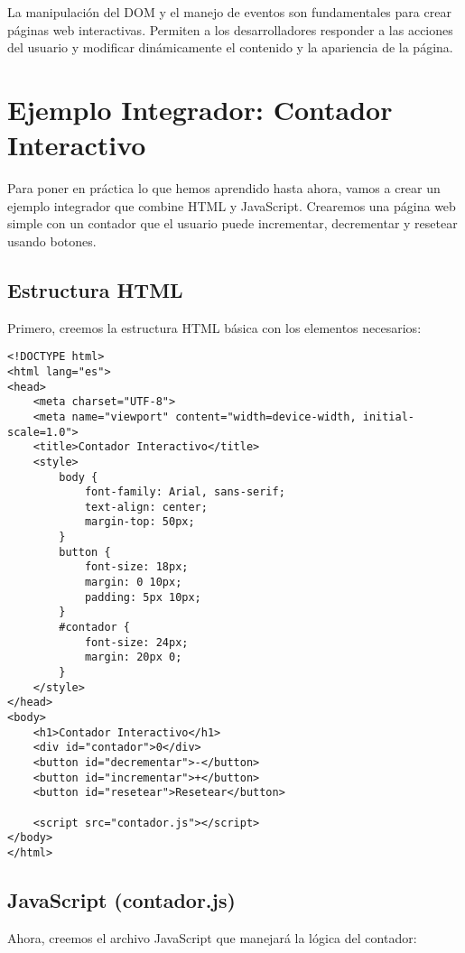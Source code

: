 \documentclass{book}
\begin{document}
La manipulación del DOM y el manejo de eventos son fundamentales para crear páginas web interactivas. Permiten a los desarrolladores responder a las acciones del usuario y modificar dinámicamente el contenido y la apariencia de la página.


\section{Ejemplo Integrador: Contador Interactivo}

Para poner en práctica lo que hemos aprendido hasta ahora, vamos a crear un ejemplo integrador que combine HTML y JavaScript. Crearemos una página web simple con un contador que el usuario puede incrementar, decrementar y resetear usando botones.

\subsection{Estructura HTML}

Primero, creemos la estructura HTML básica con los elementos necesarios:

\begin{lstlisting}[language=HTML5]
<!DOCTYPE html>
<html lang="es">
<head>
    <meta charset="UTF-8">
    <meta name="viewport" content="width=device-width, initial-scale=1.0">
    <title>Contador Interactivo</title>
    <style>
        body {
            font-family: Arial, sans-serif;
            text-align: center;
            margin-top: 50px;
        }
        button {
            font-size: 18px;
            margin: 0 10px;
            padding: 5px 10px;
        }
        #contador {
            font-size: 24px;
            margin: 20px 0;
        }
    </style>
</head>
<body>
    <h1>Contador Interactivo</h1>
    <div id="contador">0</div>
    <button id="decrementar">-</button>
    <button id="incrementar">+</button>
    <button id="resetear">Resetear</button>

    <script src="contador.js"></script>
</body>
</html>
\end{lstlisting}

\subsection{JavaScript (contador.js)}

Ahora, creemos el archivo JavaScript que manejará la lógica del contador:
\end{document}
